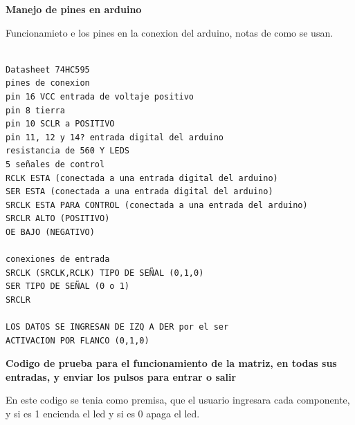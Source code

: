 \documentclass{article}
\begin{document}
 \vspace{1cm}

\textbf{Manejo de pines en arduino} 

 \vspace{1cm}
 
Funcionamieto e los pines en la conexion del arduino, notas de como se usan.
 
  \vspace{1cm}
 
 
 \begin{verbatim}

Datasheet 74HC595
pines de conexion 
pin 16 VCC entrada de voltaje positivo
pin 8 tierra
pin 10 SCLR a POSITIVO
pin 11, 12 y 14? entrada digital del arduino
resistancia de 560 Y LEDS
5 señales de control
RCLK ESTA (conectada a una entrada digital del arduino)
SER ESTA (conectada a una entrada digital del arduino)
SRCLK ESTA PARA CONTROL (conectada a una entrada del arduino)
SRCLR ALTO (POSITIVO)
OE BAJO (NEGATIVO)

conexiones de entrada
SRCLK (SRCLK,RCLK) TIPO DE SEÑAL (0,1,0)
SER TIPO DE SEÑAL (0 o 1)
SRCLR 
 
LOS DATOS SE INGRESAN DE IZQ A DER por el ser
ACTIVACION POR FLANCO (0,1,0)

\end{verbatim}


\textbf{Codigo de prueba para el funcionamiento de la matriz, en todas sus entradas, y enviar los pulsos para entrar o salir} 

 \vspace{1cm}

En este codigo se tenia como premisa, que el usuario ingresara cada componente, y si es 1 encienda el led y si es 0 apaga el led.

 \vspace{1cm}
 
\end{document}
